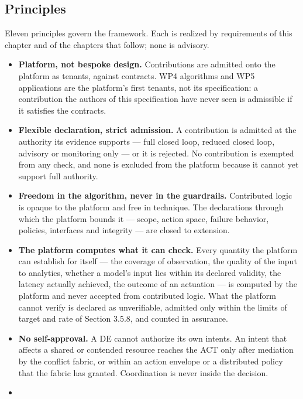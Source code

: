 \hypertarget{principles}{%
\subsection{Principles}\label{principles}}

Eleven principles govern the framework. Each is realized by requirements
of this chapter and of the chapters that follow; none is advisory.

\begin{itemize}
\tightlist
\item
  \textbf{Platform, not bespoke design.} Contributions are admitted onto
  the platform as tenants, against contracts. WP4 algorithms and WP5
  applications are the platform's first tenants, not its specification:
  a contribution the authors of this specification have never seen is
  admissible if it satisfies the contracts.
\item
  \textbf{Flexible declaration, strict admission.} A contribution is
  admitted at the authority its evidence supports --- full closed loop,
  reduced closed loop, advisory or monitoring only --- or it is
  rejected. No contribution is exempted from any check, and none is
  excluded from the platform because it cannot yet support full
  authority.
\item
  \textbf{Freedom in the algorithm, never in the guardrails.}
  Contributed logic is opaque to the platform and free in technique. The
  declarations through which the platform bounds it --- scope, action
  space, failure behavior, policies, interfaces and integrity --- are
  closed to extension.
\item
  \textbf{The platform computes what it can check.} Every quantity the
  platform can establish for itself --- the coverage of observation, the
  quality of the input to analytics, whether a model's input lies within
  its declared validity, the latency actually achieved, the outcome of
  an actuation --- is computed by the platform and never accepted from
  contributed logic. What the platform cannot verify is declared as
  unverifiable, admitted only within the limits of target and rate of
  Section 3.5.8, and counted in assurance.
\item
  \textbf{No self-approval.} A DE cannot authorize its own intents. An
  intent that affects a shared or contended resource reaches the ACT
  only after mediation by the conflict fabric, or within an action
  envelope or a distributed policy that the fabric has granted.
  Coordination is never inside the decision.
\item

\end{itemize}
